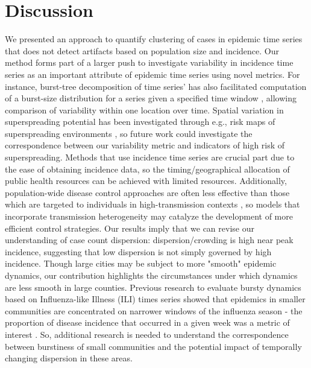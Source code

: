 \documentclass[10pt,letterpaper]{article}
\begin{document}
\section*{Discussion}
We presented an approach to quantify clustering of cases in epidemic time series that does not detect artifacts based on population size and incidence. 
Our method forms part of a larger push to investigate variability in incidence time series as an important attribute of epidemic time series using novel metrics.
For instance, burst-tree decomposition of time series’ has also facilitated computation of a burst-size distribution for a series given a specified time window \cite{jo_burst-tree_2020}, allowing comparison of variability within one location over time. 
Spatial variation in superspreading potential has been investigated through e.g., risk maps of superspreading environments \cite{loo_identification_2021}, so future work could investigate the correspondence between our variability metric and indicators of high risk of superspreading.
Methods that use incidence time series are crucial part due to the ease of obtaining incidence data, so the timing/geographical allocation of public health resources can be achieved with limited resources. 
Additionally, population-wide disease control approaches are often less effective than those which are targeted to individuals in high-transmission contexts \cite{lloyd-smith_superspreading_2005}, so models that incorporate transmission heterogeneity may catalyze the development of more efficient control strategies.
Our results imply that we can revise our understanding of case count dispersion: dispersion/crowding is high near peak incidence, suggesting that low dispersion is not simply governed by high incidence. 
Though large cities may be subject to more "smooth" epidemic dynamics, our contribution highlights the circumstances under which dynamics are less smooth in large counties. 
Previous research to evaluate bursty dynamics based on Influenza-like Illness (ILI) times series showed that epidemics in smaller communities are concentrated on narrower windows of the influenza season - the proportion of disease incidence that occurred in a given week was a metric of interest \cite{dalziel_urbanization_2018}. 
So, additional research is needed to understand the correspondence between burstiness of small communities and the potential impact of temporally changing dispersion in these areas.
\end{document}
